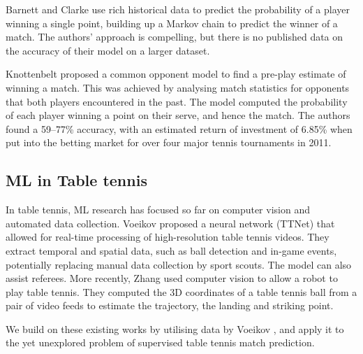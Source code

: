 Barnett and Clarke \cite{barnett2005combining} use rich historical data to predict the probability of a player winning a single point, building up a Markov chain to predict the winner of a match. The authors' approach is compelling, but there is no published data on the accuracy of their model on a larger dataset.

Knottenbelt \etal \cite{knottenbelt2012common} proposed a common opponent model to find a pre-play estimate of winning a match. This was achieved by analysing match statistics for opponents that both players encountered in the past. %
The model computed the probability of each player winning a point on their serve, and hence the match. The authors found a 59--77\% accuracy, with an estimated return of investment of 6.85\% when put into the betting market for over four major tennis tournaments in 2011. 



\subsection{ML in Table tennis}
In table tennis, ML research has focused so far on computer vision and automated data collection. %
Voeikov \etal \cite{voeikov2020ttnet} proposed a neural network (TTNet) that allowed for real-time processing of high-resolution table tennis videos. They extract temporal and spatial data, such as ball detection and in-game events,  potentially replacing manual data collection by sport scouts. The model can also assist referees. More recently, Zhang \etal \cite{zhang2010visual} used computer vision to allow a robot to play table tennis. They computed the 3D coordinates of a table tennis ball from a pair of video feeds to estimate the trajectory, the landing and striking point.

We build on these existing works by utilising data by Voeikov \etal \cite{voeikov2020ttnet}, and apply it to the yet unexplored problem of supervised table tennis match prediction.



